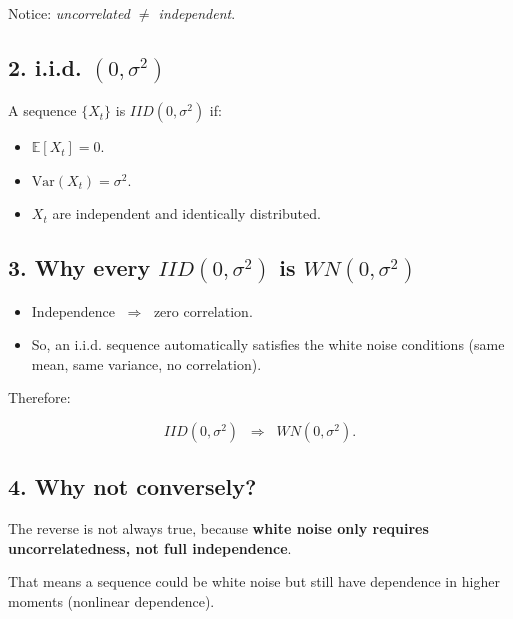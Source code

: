 \documentclass[
  11pt,
  a4paper,
]{report}
\providecommand{\tightlist}{%
  \setlength{\itemsep}{0pt}\setlength{\parskip}{0pt}}\usepackage{longtable,booktabs,array}
\begin{document}
Notice: \emph{uncorrelated \(\neq\) independent}.

\subsection{\texorpdfstring{2. i.i.d.
\((0, \sigma^2)\)}{2. i.i.d. (0, \textbackslash sigma\^{}2)}}\label{i.i.d.-0-sigma2}

A sequence \(\{X_t\}\) is \(IID(0, \sigma^2)\) if:

\begin{itemize}
\tightlist
\item
  \(\mathbb{E}[X_t] = 0\).\\
\item
  \(\mathrm{Var}(X_t) = \sigma^2\).\\
\item
  \(X_t\) are independent and identically distributed.
\end{itemize}

\subsection{\texorpdfstring{3. Why every \(IID(0, \sigma^2)\) is
\(WN(0, \sigma^2)\)}{3. Why every IID(0, \textbackslash sigma\^{}2) is WN(0, \textbackslash sigma\^{}2)}}\label{why-every-iid0-sigma2-is-wn0-sigma2}

\begin{itemize}
\tightlist
\item
  Independence \(\;\Rightarrow\;\) zero correlation.\\
\item
  So, an i.i.d. sequence automatically satisfies the white noise
  conditions (same mean, same variance, no correlation).
\end{itemize}

Therefore:

\[
IID(0, \sigma^2) \;\;\Rightarrow\;\; WN(0, \sigma^2).
\]

\subsection{4. Why not conversely?}\label{why-not-conversely}

The reverse is not always true, because \textbf{white noise only
requires uncorrelatedness, not full independence}.

That means a sequence could be white noise but still have dependence in
higher moments (nonlinear dependence).
\end{document}
